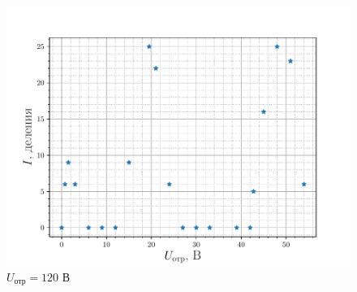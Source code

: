 \begin{figure}[H]
		\centering
		\includegraphics[height=0.4\textheight]{fig/res120V_1}
		\caption{$U_{\text{отр}}=120$ В}
		\label{fig:res120V_1}
\end{figure}
